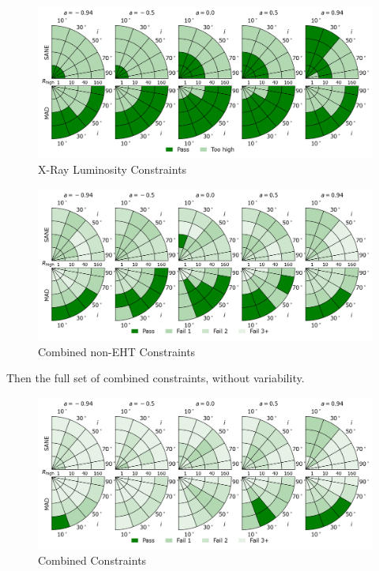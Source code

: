 \begin{figure}
  \centering
  \includegraphics[width=\textwidth]{./figures/Xray_flux_Constraints.png}
  \caption{X-Ray Luminosity Constraints}
  \label{fig:xray_pizza}
\end{figure}
\begin{figure}
  \centering
  \includegraphics[width=\textwidth]{./figures/Non_Interferometric_Constraints.png}
  \caption{Combined non-EHT Constraints}
  \label{fig:noneht_pizza}
\end{figure}

Then the full set of combined constraints, without variability.

\begin{figure}
  \centering
  \includegraphics[width=\textwidth]{./figures/All_Constraints.png}
  \caption{Combined Constraints}
  \label{fig:all_pizza}
\end{figure}








